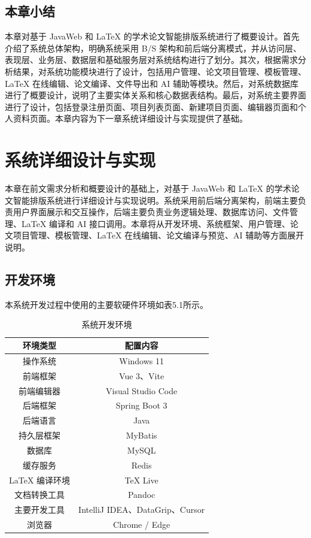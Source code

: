 \documentclass[twoside,openright]{xduugthesis}
\begin{document}
\section{本章小结}
本章对基于 JavaWeb 和 LaTeX 的学术论文智能排版系统进行了概要设计。首先介绍了系统总体架构，明确系统采用 B/S 架构和前后端分离模式，并从访问层、表现层、业务层、数据层和基础服务层对系统结构进行了划分。其次，根据需求分析结果，对系统功能模块进行了设计，包括用户管理、论文项目管理、模板管理、LaTeX 在线编辑、论文编译、文件导出和 AI 辅助等模块。然后，对系统数据库进行了概要设计，说明了主要实体关系和核心数据表结构。最后，对系统主要界面进行了设计，包括登录注册页面、项目列表页面、新建项目页面、编辑器页面和个人资料页面。本章内容为下一章系统详细设计与实现提供了基础。

\chapter{系统详细设计与实现}
本章在前文需求分析和概要设计的基础上，对基于 JavaWeb 和 LaTeX 的学术论文智能排版系统进行详细设计与实现说明。系统采用前后端分离架构，前端主要负责用户界面展示和交互操作，后端主要负责业务逻辑处理、数据库访问、文件管理、LaTeX 编译和 AI 接口调用。本章将从开发环境、系统框架、用户管理、论文项目管理、模板管理、LaTeX 在线编辑、论文编译与预览、AI 辅助等方面展开说明。

\section{开发环境}

本系统开发过程中使用的主要软硬件环境如表5.1所示。

\begin{table}[H]
    \centering
    \caption{系统开发环境}
    \label{tab:development-environment}
    \begin{tabular}{|c|c|}
        \hline
        \textbf{环境类型} & \textbf{配置内容} \\ \hline
        操作系统 & Windows 11 \\ \hline
        前端框架 & Vue 3、Vite \\ \hline
        前端编辑器 & Visual Studio Code \\ \hline
        后端框架 & Spring Boot 3 \\ \hline
        后端语言 & Java \\ \hline
        持久层框架 & MyBatis \\ \hline
        数据库 & MySQL \\ \hline
        缓存服务 & Redis \\ \hline
        \LaTeX{} 编译环境 & TeX Live \\ \hline
        文档转换工具 & Pandoc \\ \hline
        主要开发工具 & IntelliJ IDEA、DataGrip、Cursor \\ \hline
        浏览器 & Chrome / Edge \\ \hline
    \end{tabular}
\end{table}
\end{document}

